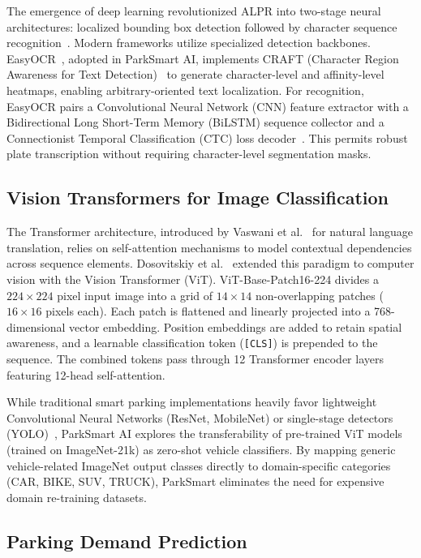 \documentclass[conference,10pt]{IEEEtran}
\begin{document}
The emergence of deep learning revolutionized ALPR into two-stage neural architectures: localized bounding box detection followed by character sequence recognition~\cite{du2018}. Modern frameworks utilize specialized detection backbones. EasyOCR~\cite{easyocr}, adopted in ParkSmart AI, implements CRAFT (Character Region Awareness for Text Detection)~\cite{baek2019} to generate character-level and affinity-level heatmaps, enabling arbitrary-oriented text localization. For recognition, EasyOCR pairs a Convolutional Neural Network (CNN) feature extractor with a Bidirectional Long Short-Term Memory (BiLSTM) sequence collector and a Connectionist Temporal Classification (CTC) loss decoder~\cite{shi2017}. This permits robust plate transcription without requiring character-level segmentation masks.

\subsection{Vision Transformers for Image Classification}

The Transformer architecture, introduced by Vaswani et al.~\cite{vaswani2017} for natural language translation, relies on self-attention mechanisms to model contextual dependencies across sequence elements. Dosovitskiy et al.~\cite{dosovitskiy2021} extended this paradigm to computer vision with the Vision Transformer (ViT). ViT-Base-Patch16-224 divides a $224\times224$ pixel input image into a grid of $14\times14$ non-overlapping patches ($16\times16$ pixels each). Each patch is flattened and linearly projected into a 768-dimensional vector embedding. Position embeddings are added to retain spatial awareness, and a learnable classification token (\texttt{[CLS]}) is prepended to the sequence. The combined tokens pass through 12 Transformer encoder layers featuring 12-head self-attention.

While traditional smart parking implementations heavily favor lightweight Convolutional Neural Networks (ResNet, MobileNet) or single-stage detectors (YOLO)~\cite{redmon2016}, ParkSmart AI explores the transferability of pre-trained ViT models (trained on ImageNet-21k) as zero-shot vehicle classifiers. By mapping generic vehicle-related ImageNet output classes directly to domain-specific categories (CAR, BIKE, SUV, TRUCK), ParkSmart eliminates the need for expensive domain re-training datasets.

\subsection{Parking Demand Prediction}
\end{document}
